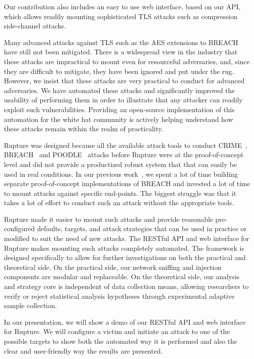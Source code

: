 \documentclass[a4paper, 11 pt, conference]{article}
\begin{document}
Our contribution also includes an easy to use web interface, based on our API, which allows readily mounting sophisticated TLS attacks such as compression side-channel attacks. 
	
	Many advanced attacks against TLS such as the AES extensions to BREACH have still not been mitigated. There is a widespread view in the industry that these attacks are impractical to mount even for resourceful adversaries, and, since they are difficult to mitigate, they have been ignored and put under the rug. However, we insist that these attacks are very practical to conduct for advanced adversaries. We have automated these attacks and significantly improved the usability of performing them in order to illustrate that any attacker can readily exploit such vulnerabilities. Providing an open-source implementation of this automation for the white hat community is actively helping understand how these attacks remain within the realm of practicality.
	
	Rupture was designed because all the available attack tools to conduct CRIME~\cite{c1}, BREACH~\cite{c3} and POODLE~\cite{c2} attacks before Rupture were at the proof-of-concept level and did not provide a productized robust system that that can easily be used in real conditions. In our previous work~\cite{c15}, we spent a lot of time building separate proof-of-concept implementations of BREACH and invested a lot of time to mount attacks against specific end-points. The biggest struggle was that it takes a lot of effort to conduct such an attack without the appropriate tools. 
	
	Rupture made it easier to mount such attacks and provide reasonable pre-configured defaults, targets, and attack strategies that can be used in practice or modified to suit the need of new attacks. The RESTful API and web interface for Rupture makes mounting such attacks completely automated. The framework is designed specifically to allow for further investigations on both the practical and theoretical side. On the practical side, our network sniffing and injection components are modular and replaceable. On the theoretical side, our analysis and strategy core is independent of data collection means, allowing researchers to verify or reject statistical analysis hypotheses through experimental adaptive sample collection.
	
	In our presentation, we will show a demo of our RESTful API and web interface for Rupture. We will configure a victim and initiate an attack to one of the possible targets to show both the automated way it is performed and also the clear and user-friendly way the results are presented.
\end{document}
